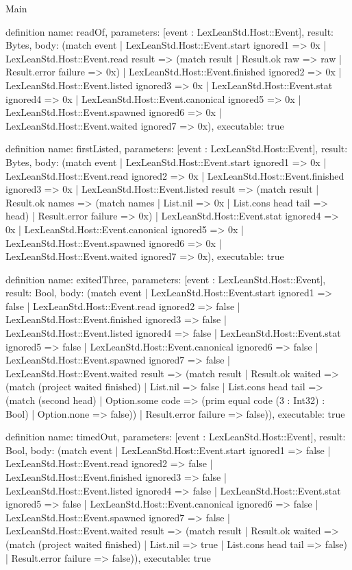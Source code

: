 \begin{lexlean}{Main}
\begin{semanticmodule}
definition{
  name: readOf,
  parameters: [event : LexLeanStd.Host::Event],
  result: Bytes,
  body: (match event
    | LexLeanStd.Host::Event.start ignored1 => 0x
    | LexLeanStd.Host::Event.read result => (match result
      | Result.ok raw => raw
      | Result.error failure => 0x)
    | LexLeanStd.Host::Event.finished ignored2 => 0x
    | LexLeanStd.Host::Event.listed ignored3 => 0x
    | LexLeanStd.Host::Event.stat ignored4 => 0x
    | LexLeanStd.Host::Event.canonical ignored5 => 0x
    | LexLeanStd.Host::Event.spawned ignored6 => 0x
    | LexLeanStd.Host::Event.waited ignored7 => 0x),
  executable: true
}

definition{
  name: firstListed,
  parameters: [event : LexLeanStd.Host::Event],
  result: Bytes,
  body: (match event
    | LexLeanStd.Host::Event.start ignored1 => 0x
    | LexLeanStd.Host::Event.read ignored2 => 0x
    | LexLeanStd.Host::Event.finished ignored3 => 0x
    | LexLeanStd.Host::Event.listed result => (match result
      | Result.ok names => (match names | List.nil => 0x | List.cons head tail => head)
      | Result.error failure => 0x)
    | LexLeanStd.Host::Event.stat ignored4 => 0x
    | LexLeanStd.Host::Event.canonical ignored5 => 0x
    | LexLeanStd.Host::Event.spawned ignored6 => 0x
    | LexLeanStd.Host::Event.waited ignored7 => 0x),
  executable: true
}

definition{
  name: exitedThree,
  parameters: [event : LexLeanStd.Host::Event],
  result: Bool,
  body: (match event
    | LexLeanStd.Host::Event.start ignored1 => false
    | LexLeanStd.Host::Event.read ignored2 => false
    | LexLeanStd.Host::Event.finished ignored3 => false
    | LexLeanStd.Host::Event.listed ignored4 => false
    | LexLeanStd.Host::Event.stat ignored5 => false
    | LexLeanStd.Host::Event.canonical ignored6 => false
    | LexLeanStd.Host::Event.spawned ignored7 => false
    | LexLeanStd.Host::Event.waited result => (match result
      | Result.ok waited => (match (project waited finished)
        | List.nil => false
        | List.cons head tail => (match (second head)
          | Option.some code => (prim equal code (3 : Int32) : Bool)
          | Option.none => false))
      | Result.error failure => false)),
  executable: true
}

definition{
  name: timedOut,
  parameters: [event : LexLeanStd.Host::Event],
  result: Bool,
  body: (match event
    | LexLeanStd.Host::Event.start ignored1 => false
    | LexLeanStd.Host::Event.read ignored2 => false
    | LexLeanStd.Host::Event.finished ignored3 => false
    | LexLeanStd.Host::Event.listed ignored4 => false
    | LexLeanStd.Host::Event.stat ignored5 => false
    | LexLeanStd.Host::Event.canonical ignored6 => false
    | LexLeanStd.Host::Event.spawned ignored7 => false
    | LexLeanStd.Host::Event.waited result => (match result
      | Result.ok waited => (match (project waited finished)
        | List.nil => true
        | List.cons head tail => false)
      | Result.error failure => false)),
  executable: true
}


\end{semanticmodule}
\end{lexlean}
